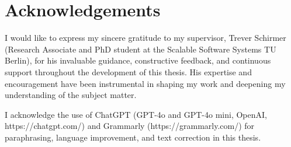 \documentclass[a4paper, 11pt]{article}
\begin{document}
\newpage

\section*{Acknowledgements}
I would like to express my sincere gratitude to my supervisor, Trever Schirmer (Research Associate and PhD student at the Scalable Software Systems TU Berlin), for his invaluable guidance, constructive feedback, and continuous support throughout the development of this thesis. His expertise and encouragement have been instrumental in shaping my work and deepening my understanding of the subject matter.

I acknowledge the use of ChatGPT (GPT-4o and GPT-4o mini, OpenAI, https://chatgpt.com/) and Grammarly (https://grammarly.com/) for paraphrasing, language improvement, and text correction in this thesis.

\clearpage

\tableofcontents


\clearpage

\clearpage

\clearpage

\clearpage

\clearpage

\clearpage

\clearpage


\newpage
\printbibliography
\end{document}
